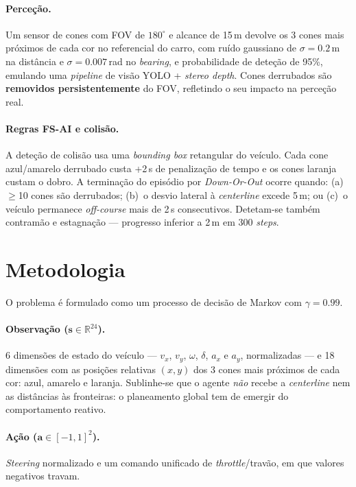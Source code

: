 \documentclass[runningheads]{llncs}
\begin{document}
\paragraph{Perceção.} Um sensor de cones com FOV de $180^\circ$ e alcance de 15\,m devolve os 3 cones mais próximos de cada cor no referencial do carro, com ruído gaussiano de $\sigma=0.2$\,m na distância e $\sigma=0.007$\,rad no \textit{bearing}, e probabilidade de deteção de 95\%, emulando uma \textit{pipeline} de visão YOLO + \textit{stereo depth}. Cones derrubados são \textbf{removidos persistentemente} do FOV, refletindo o seu impacto na perceção real.

\paragraph{Regras FS-AI e colisão.} A deteção de colisão usa uma \textit{bounding box} retangular do veículo. Cada cone azul/amarelo derrubado custa +2\,s de penalização de tempo e os cones laranja custam o dobro. A terminação do episódio por \textit{Down-Or-Out} ocorre quando: (a)~$\geq$10 cones são derrubados; (b)~o desvio lateral à \textit{centerline} excede 5\,m; ou (c)~o veículo permanece \textit{off-course} mais de 2\,s consecutivos. Detetam-se também contramão e estagnação --- progresso inferior a 2\,m em 300 \textit{steps}.

\section{Metodologia}

O problema é formulado como um processo de decisão de Markov com $\gamma = 0.99$.

\paragraph{Observação ($\mathbf{s} \in \mathbb{R}^{24}$).} 6 dimensões de estado do veículo --- $v_x$, $v_y$, $\omega$, $\delta$, $a_x$ e $a_y$, normalizadas --- e 18 dimensões com as posições relativas $(x,y)$ dos 3 cones mais próximos de cada cor: azul, amarelo e laranja. Sublinhe-se que o agente \emph{não} recebe a \textit{centerline} nem as distâncias às fronteiras: o planeamento global tem de emergir do comportamento reativo.

\paragraph{Ação ($\mathbf{a} \in [-1,1]^2$).} \textit{Steering} normalizado e um comando unificado de \textit{throttle}/travão, em que valores negativos travam.
\end{document}
